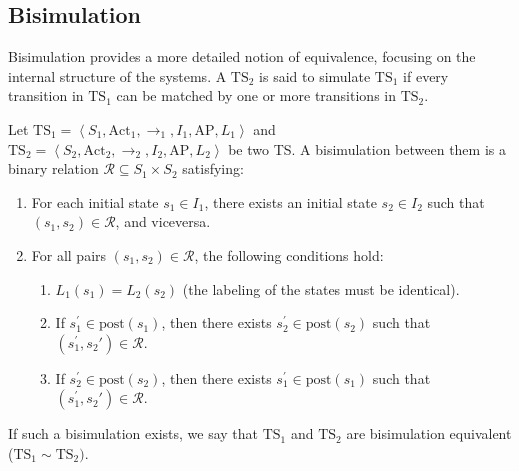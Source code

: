 \subsection{Bisimulation}
Bisimulation provides a more detailed notion of equivalence, focusing on the internal structure of the systems.
A $\text{TS}_2$  is said to simulate $\text{TS}_1$ if every transition in $\text{TS}_1$ can be matched by one or more transitions in $\text{TS}_2$.
\begin{definition}
    Let $\text{TS}_1=\left\langle S_1,\text{Act}_1,\rightarrow_1,I_1,\text{AP},L_1\right\rangle$ and \\ 
    $\text{TS}_2=\left\langle S_2,\text{Act}_2,\rightarrow_2,I_2,\text{AP},L_2\right\rangle$ be two TS.
    A bisimulation between them is a binary relation $\mathcal{R}\subseteq S_1\times S_2$ satisfying:
    \begin{enumerate}
        \item For each initial state $s_1\in I_1$, there exists an initial state $s_2\in I_2$ such that $(s_1,s_2)\in \mathcal{R}$, and viceversa. 
        \item For all pairs $(s_1,s_2)\in \mathcal{R}$, the following conditions hold: 
            \begin{enumerate}
                \item $L_1(s_1)=L_2(s_2)$ (the labeling of the states must be identical). 
                \item If $s_1^\prime\in\text{post}(s_1)$, then there exists $s_2^\prime\in\text{post}(s_2)$ such that $(s_1^\prime,s_2\prime)\in\mathcal{R}$. 
                \item If $s_2^\prime\in\text{post}(s_2)$, then there exists $s_1^\prime\in\text{post}(s_1)$ such that $(s_1^\prime,s_2\prime)\in\mathcal{R}$. 
            \end{enumerate}
    \end{enumerate}
    If such a bisimulation exists, we say that $\text{TS}_1$ and $\text{TS}_2$ are bisimulation equivalent ($\text{TS}_1\sim \text{TS}_2)$. 
\end{definition}

